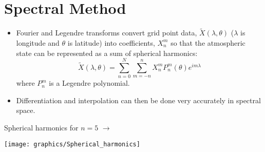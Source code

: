 \begin{minipage}[t]{0.68\columnwidth}%

\section{Spectral Method}
\begin{itemize}
\item Fourier and Legendre transforms convert grid point data, $\tilde{X}(\lambda,\theta)$
($\lambda$ is longitude and $\theta$ is latitude) into coefficients,
$X_{n}^{m}$ so that the atmospheric state can be represented as a
sum of spherical harmonics:
\[
\tilde{X}(\lambda,\theta)=\sum_{n=0}^{N}\sum_{m=-n}^{n}X_{n}^{m}P_{n}^{m}(\theta)e^{im\lambda}
\]
where $P_{n}^{m}$ is a Legendre polynomial.
\item Differentiation and interpolation can then be done very accurately
in spectral space.
\end{itemize}
\begin{flushright}
\vspace{2cm}
Spherical harmonics for $n=5$ $\rightarrow$
\par\end{flushright}%
\end{minipage} %
\begin{minipage}[t]{0.3\columnwidth}%
\phantom{}\texttt{[image: graphics/Spherical\_harmonics]}%
\end{minipage}

\clearpage{}

